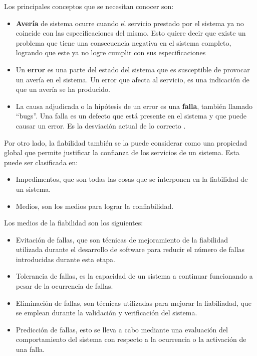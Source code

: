 Los principales conceptos que se necesitan conocer son:

\begin{itemize}
\item \textbf{Avería} de sistema ocurre cuando el servicio prestado por el sistema ya no coincide con las especificaciones del mismo. Esto quiere decir que existe un problema que tiene
una consecuencia negativa en el sistema completo, logrando que este ya no logre cumplir con sus
especificaciones
\item Un \textbf{error} es una parte del estado del sistema
que es susceptible de provocar un avería en el sistema. Un error que afecta al servicio, es una
indicación de que un avería se ha producido.
\item La causa adjudicada o la hipótesis de un error es una \textbf{falla}, también llamado ``bugs''. Una falla es un defecto que está presente en el sistema y que puede causar un error. Es la desviación actual de lo correcto \cite{Hanmer07}.
\end{itemize}

Por otro lado, la fiabilidad también se la puede considerar como una propiedad global que permite justificar la confianza de los servicios de un sistema. Esta puede ser clasificada en:
\begin{itemize}
\item Impedimentos, que son todas las cosas que se interponen en la fiabilidad de un sistema.
\item Medios, son los medios para lograr la confiabilidad. 
\end{itemize}

Los medios de la fiabilidad son los siguientes:
\begin{itemize}
\item Evitación de fallas, que son técnicas de mejoramiento de la fiabilidad utilizada durante el
desarrollo de software para reducir el número de fallas introducidas durante esta etapa.
\item Tolerancia de fallas, es la capacidad de un sistema a continuar funcionando a pesar de la ocurrencia de fallas.
\item Eliminación de fallas, son técnicas utilizadas para mejorar la fiabiliadad, que se
emplean durante la validación y verificación del sistema.
\item Predicción de fallas, esto se lleva a cabo mediante una evaluación del comportamiento del
sistema con respecto a la ocurrencia o la activación de una falla. 
\end{itemize}

